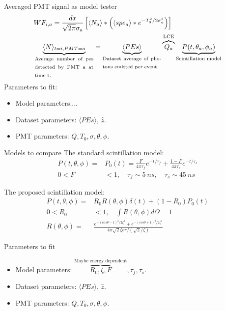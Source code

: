 \documentclass{beamer}
\begin{document}
\begin{frame}{Averaged PMT signal as model tester}
\begin{equation}
\begin{split}
 &WF_{i,a}=\frac{dx}{\sqrt{2\pi}\sigma_a}\left[\langle N_a\rangle*\left(\langle spe_a\rangle*e^{-T_0^2/2\sigma^2_a}\right)\right]\\
&\underbrace{\langle N\rangle_{t=i,PMT=a}}_{\text{\parbox{3cm}{Average number of pes detected by PMT a at time t.}}}=\underbrace{\langle PEs\rangle}_{\text{\parbox{3cm}{Dataset average of photons emitted per event.}}}\overbrace{Q_a}^{\text{LCE}}\underbrace{P(t,\theta_a,\phi_a)}_{\text{Scintillation model}}
\end{split}
\end{equation}
Parameters to fit:
\begin{itemize}
\item Model parameters:...\\
\item Dataset parameters: $\langle PEs\rangle$, $\hat{z}$.
\item PMT parameters: $Q, T_0, \sigma, \theta, \phi.$ 
\end{itemize}
\end{frame}

\begin{frame}{Models to compare}
The standard scintillation model:
\begin{equation}
\begin{split}
    P(t,\theta,\phi)=&P_0(t)=\frac{F}{4\pi\tau_f}e^{-t/\tau_f}+\frac{1-F}{4\pi\tau_s}e^{-t/\tau_s}\\
    0<F&<1, \quad \tau_f\sim5~ns, \quad \tau_s\sim45~ns
\end{split}
\end{equation}

The proposed scintillation model:
\begin{equation}
\begin{split}
    P(t,\theta,\phi)=&R_0R(\theta,\phi)\delta(t)+(1-R_0)P_0(t)\\
    0<R_0&<1, \quad \int R(\theta,\phi)d\Omega=1\\
   R(\theta,\phi)=&\frac{e^{-(cos\theta-1)^2/2\zeta^2}+e^{-(cos\theta+1)^2/2\zeta^2}}{4\pi\sqrt{2}\zeta erf(\sqrt{2}/\zeta)}
\end{split}
\end{equation}
\end{frame}

\begin{frame}{Parameters to fit}
\begin{itemize}
\item Model parameters: $\overbrace{R_0, \zeta, F}^{\text{Maybe energy dependent}}, \tau_f, \tau_s.$
\item Dataset parameters: $\langle PEs\rangle$, $\hat{z}$.
\item PMT parameters: $Q, T_0, \sigma, \theta, \phi.$ 
\end{itemize}
\end{frame}
\end{document}
